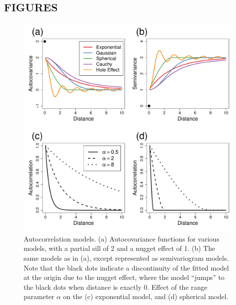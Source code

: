 \documentclass[11pt, titlepage]{article}\usepackage[]{graphicx}\usepackage[]{color}
\begin{document}
\begin{spacing}{1.9}
\begin{flushleft}

\clearpage


\section*{FIGURES}


\begin{singlespace}

	\begin{figure}[H]
	  \begin{center}
	    \includegraphics[width=\linewidth]{figure/Fig-autocorrModels-1.pdf}
	  \end{center}
	  \caption{Autocorrelation models. (a) Autocovariance functions for various models, with a partial sill of 2 and a nugget effect of 1. (b) The same models as in (a), except represented as semivariogram models. Note that the black dots indicate a discontinuity of the fitted model at the origin due to the nugget effect, where the model ``jumps'' to the black dots when distance is exactly 0. Effect of the range parameter $\alpha$ on the (c) exponential model, and (d) spherical model.  \label{fig:autocorrModels}}
  \end{figure}



\end{singlespace}
\end{flushleft}
\end{spacing}
\end{document}
